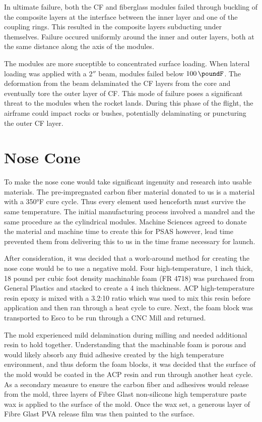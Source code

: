 \documentclass{aiaa-tc}%
\begin{document}
In ultimate failure, both the CF and fiberglass modules failed through buckling of the composite layers at the interface between the inner layer and one of the coupling rings.
This resulted in the composite layers subducting under themselves.
Failure occured uniformly around the inner and outer layers, both at the same distance along the axis of the modules. 

The modules are more suceptible to concentrated surface loading. 
When lateral loading was applied with a $2''$ beam, modules failed below $\SI{100}{\poundF}$. 
The deformation from the beam delaminated the CF layers from the core and eventually tore the outer layer of CF. 
This mode of failure poses a significant threat to the modules when the rocket lands. 
During this phase of the flight, the airframe could impact rocks or bushes, potentially delaminating or puncturing the outer CF layer. 

\section{Nose Cone}\label{sec:noseCone}

To make the nose cone would take significant ingenuity and research into usable materials. The pre-impregnated carbon fiber material donated to us is a material with a 350°F cure cycle. Thus every element used henceforth must survive the same temperature. The initial manufacturing process involved a mandrel and the same procedure as the cylindrical modules. Machine Sciences agreed to donate the material and machine time to create this for PSAS however, lead time prevented them from delivering this to us in the time frame necessary for launch. 

After consideration, it was decided that a work-around method for creating the nose cone would be to use a negative mold. Four high-temperature, 1 inch thick, 18 pound per cubic foot density machinable foam (FR 4718) was purchased from General Plastics and stacked to create a 4 inch thickness. ACP high-temperature resin epoxy is mixed with a 3.2:10 ratio which was used to mix this resin before application and then ran through a heat cycle to cure. Next, the foam block was transported to Esco to be run through a CNC Mill and returned. 

The mold experienced mild delamination during milling and needed additional resin to hold together. Understanding that the machinable foam is porous and would likely absorb any fluid adhesive created by the high temperature environment, and thus deform the foam blocks, it was decided that the surface of the mold would be coated in the ACP resin and run through another heat cycle. As a secondary measure to ensure the carbon fiber and adhesives would release from the mold, three layers of Fibre Glast non-silicone high temperature paste wax is applied to the surface of the mold. Once the wax set, a generous layer of Fibre Glast PVA release film was then painted to the surface. 
\end{document}
